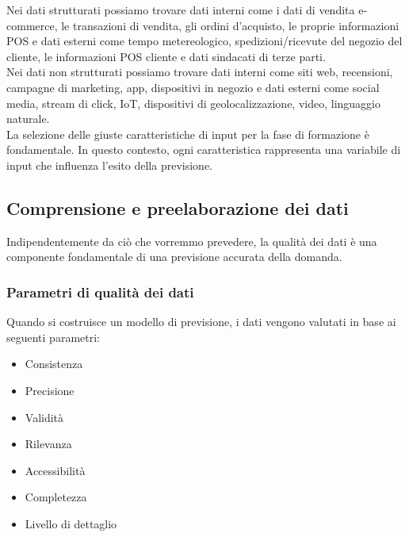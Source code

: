 \documentclass[12pt,a4paper]{report}
\begin{document}
Nei dati strutturati possiamo trovare dati interni come i dati di vendita e-commerce, le transazioni di vendita, gli ordini d'acquisto, le proprie informazioni POS e dati esterni come tempo metereologico, spedizioni/ricevute del negozio del cliente, le informazioni POS cliente e dati sindacati di terze parti.\\
Nei dati non strutturati possiamo trovare dati interni come siti web, recensioni, campagne di marketing, app, dispositivi in negozio e dati esterni come social media, stream di click, IoT, dispositivi di geolocalizzazione, video, linguaggio naturale.\\
La selezione delle giuste caratteristiche di input per la fase di formazione è fondamentale. In questo contesto, ogni caratteristica rappresenta una variabile di input che influenza l'esito della previsione. 

\subsection{Comprensione e preelaborazione dei dati}
Indipendentemente da ciò che vorremmo prevedere, la qualità dei dati è una componente fondamentale di una previsione accurata della domanda.

\subsubsection{Parametri di qualità dei dati}
Quando si costruisce un modello di previsione, i dati vengono valutati in base ai seguenti parametri:
\begin{itemize}
    \item Consistenza
    \item Precisione
    \item Validità
    \item Rilevanza
    \item Accessibilità
    \item Completezza
    \item Livello di dettaglio
\end{itemize}
\end{document}
